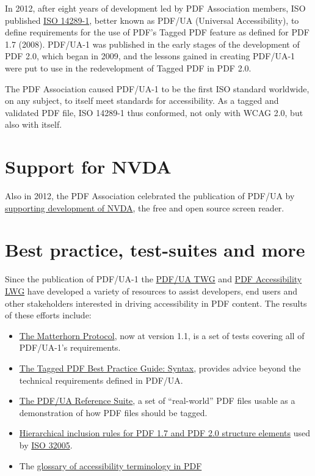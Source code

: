 \documentclass[12pt,a4paper]{article}
\begin{document}
In 2012, after eight years of development led by PDF Association
members, ISO published
\href{https://pdfa.org/resource/iso-14289-pdfua/}{ISO 14289-1}, better
known as PDF/UA (Universal Accessibility), to define requirements for
the use of PDF's Tagged PDF feature as defined for PDF 1.7 (2008).
PDF/UA-1 was published in the early stages of the development of PDF
2.0, which began in 2009, and the lessons gained in creating PDF/UA-1
were put to use in the redevelopment of Tagged PDF in PDF 2.0.

The PDF Association caused PDF/UA-1 to be the first ISO standard
worldwide, on any subject, to itself meet standards for accessibility.
As a tagged and validated PDF file, ISO 14289-1 thus conformed, not only
with WCAG 2.0, but also with itself. 🙂

\section{Support for NVDA}\label{support-for-nvda}

Also in 2012, the PDF Association celebrated the publication of PDF/UA
by
\href{https://pdfa.org/nvda-goes-pdfua-the-pdf-association-steps-up-to-fund-development-of-the-worlds-first-pdfua-conforming-screen-reader/}{supporting
development of NVDA}, the free and open source screen reader.

\section{Best practice, test-suites and
more}\label{best-practice-test-suites-and-more}

Since the publication of PDF/UA-1 the
\href{https://pdfa.org/community/pdf-ua-technical-working-group/}{PDF/UA
TWG} and
\href{https://pdfa.org/community/pdf-accessibility-liaison-working-group/}{PDF
Accessibility LWG} have developed a variety of resources to assist
developers, end users and other stakeholders interested in driving
accessibility in PDF content. The results of these efforts include:
\begin{itemize}
\item
  \href{https://pdfa.org/resource/the-matterhorn-protocol/}{The
  Matterhorn Protocol}, now at version 1.1, is a set of tests covering
  all of PDF/UA-1's requirements.
\item
  \href{https://pdfa.org/resource/tagged-pdf-best-practice-guide-syntax/}{The
  Tagged PDF Best Practice Guide: Syntax}, provides advice beyond the
  technical requirements defined in PDF/UA.
\item
  \href{https://pdfa.org/resource/pdfua-reference-suite/}{The PDF/UA
  Reference Suite}, a set of ``real-world'' PDF files usable as a
  demonstration of how PDF files should be tagged.
\item
  \href{https://pdfa.org/resource/iso-ts-32005-hierarchical-inclusion-rules/}{Hierarchical
  inclusion rules for PDF 1.7 and PDF 2.0 structure elements} used by
  \href{https://pdfa.org/resource/iso-32005/}{ISO 32005}.
\item
  The
  \href{https://pdfa.org/glossary-of-accessibility-terminology-in-pdf/}{glossary
  of accessibility terminology in PDF}
\end{itemize}
\end{document}
